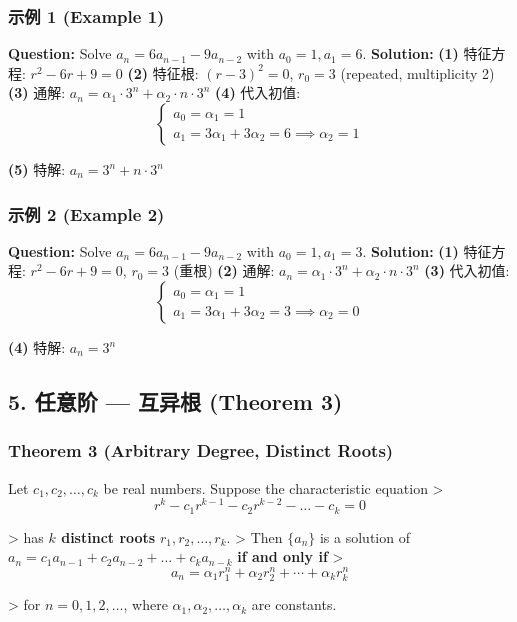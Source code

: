 \documentclass[10pt,a4paper,openany]{ctexbook}
\theoremstyle{definition}
\theoremstyle{remark}
\renewenvironment{quote}
  {\list{}{\leftmargin=1em\rightmargin=0pt\topsep=0.5pt\partopsep=0pt}\item[]}
  {\endlist}
\begin{document}
\subsubsection{示例 1 (Example 1)}

\textbf{Question:} Solve $a_n = 6a_{n-1} - 9a_{n-2}$ with $a_0 = 1, a_1 = 6$.
\textbf{Solution:}
\textbf{(1)} 特征方程: $r^2 - 6r + 9 = 0$
\textbf{(2)} 特征根: $(r-3)^2 = 0$, $r_0 = 3$ (repeated, multiplicity 2)
\textbf{(3)} 通解: $a_n = \alpha_1 \cdot 3^n + \alpha_2 \cdot n \cdot 3^n$
\textbf{(4)} 代入初值:
\[
\begin{cases}
a_0 = \alpha_1 = 1 \\
a_1 = 3\alpha_1 + 3\alpha_2 = 6 \implies \alpha_2 = 1
\end{cases}
\]

\textbf{(5)} 特解: $a_n = 3^n + n \cdot 3^n$
\vspace{-2pt}

\subsubsection{示例 2 (Example 2)}

\textbf{Question:} Solve $a_n = 6a_{n-1} - 9a_{n-2}$ with $a_0 = 1, a_1 = 3$.
\textbf{Solution:}
\textbf{(1)} 特征方程: $r^2 - 6r + 9 = 0$, $r_0 = 3$ (重根)
\textbf{(2)} 通解: $a_n = \alpha_1 \cdot 3^n + \alpha_2 \cdot n \cdot 3^n$
\textbf{(3)} 代入初值:
\[
\begin{cases}
a_0 = \alpha_1 = 1 \\
a_1 = 3\alpha_1 + 3\alpha_2 = 3 \implies \alpha_2 = 0
\end{cases}
\]

\textbf{(4)} 特解: $a_n = 3^n$
\vspace{-2pt}

\subsection{5. 任意阶 — 互异根 (Theorem 3)}

\subsubsection{Theorem 3 (Arbitrary Degree, Distinct Roots)}

\begin{quote}
Let $c_1, c_2, \dots, c_k$ be real numbers. Suppose the characteristic equation
>
\[
r^k - c_1 r^{k-1} - c_2 r^{k-2} - \dots - c_k = 0
\]

>
has \textbf{$k$ distinct roots} $r_1, r_2, \dots, r_k$.
>
Then $\{a_n\}$ is a solution of $a_n = c_1 a_{n-1} + c_2 a_{n-2} + \dots + c_k a_{n-k}$ \textbf{if and only if}
>
\[
a_n = \alpha_1 r_1^n + \alpha_2 r_2^n + \cdots + \alpha_k r_k^n
\]

>
for $n = 0, 1, 2, \dots$, where $\alpha_1, \alpha_2, \dots, \alpha_k$ are constants.

\end{quote}
\vspace{-2pt}
\end{document}
